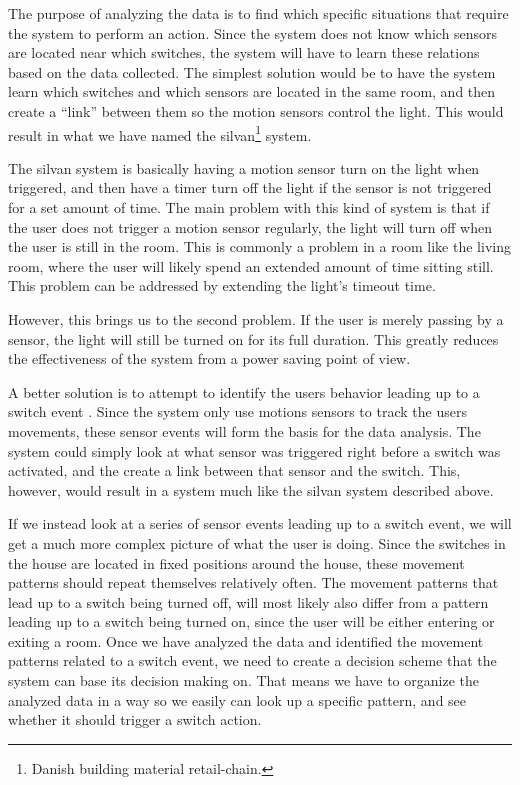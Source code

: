 The purpose of analyzing the data is to find which specific situations that require the system to perform an action. Since the system does not know which sensors are located near which switches, the system will have to learn these relations based on the data collected. The simplest solution would be to have the system learn which switches and which sensors are located in the same room, and then create a ``link'' between them so the motion sensors control the light. This would result in what we have named the silvan\footnote{Danish building material retail-chain. } system. 

The silvan system is basically having a motion sensor turn on the light when triggered, and then have a timer turn off the light if the sensor is not triggered for a set amount of time. The main problem with this kind of system is that if the user does not trigger a motion sensor regularly, the light will turn off when the user is still in the room. This is commonly a problem in a room like the living room, where the user will likely spend an extended amount of time sitting still. This problem can be addressed by extending the light's timeout time. 

However, this brings us to the second problem. If the user is merely passing by a sensor, the light will still be turned on for its full duration. This greatly reduces the effectiveness of the system from a power saving point of view. 

A better solution is to attempt to identify the users behavior leading up to a switch event . Since the system only use motions sensors to track the users movements, these sensor events will form the basis for the data analysis. The system could simply look at what sensor was triggered right before a switch was activated, and the create a link between that sensor and the switch. This, however, would result in a system much like the silvan system described above. 

If we instead look at a series of sensor events leading up to a switch event, we will get a much more complex picture of what the user is doing. Since the switches in the house are located in fixed positions around the house, these movement patterns should repeat themselves relatively often. The movement patterns that lead up to a switch being turned off, will most likely also differ from a pattern leading up to a switch being turned on, since the user will be either entering or exiting a room. Once we have analyzed the data and identified the movement patterns related to a switch event, we need to create a decision scheme that the system can base its decision making on. That means we have to organize the analyzed data in a way so we easily can look up a specific pattern, and see whether it should trigger a switch action.

